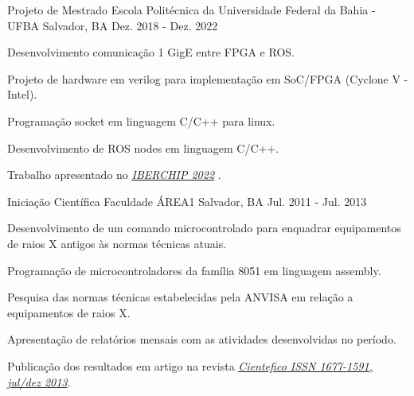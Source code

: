 \begin{cventries}
  \cventry
    {Projeto de Mestrado} %
    {Escola Politécnica da Universidade Federal da Bahia - UFBA} %
    {Salvador, BA} %
    {Dez. 2018 - Dez. 2022} %
    {
      \begin{cvitems} %
        \item {Desenvolvimento comunicação 1 GigE entre FPGA e ROS.}
        \item {Projeto de hardware em verilog para implementação em SoC/FPGA (Cyclone V - Intel).}
        \item {Programação socket em linguagem C/C++ para linux.}
        \item {Desenvolvimento de ROS nodes em linguagem C/C++.}
        \item {Trabalho apresentado no  \underline{\href{https://ieee-lascas.org/}{\emph{IBERCHIP 2022}}} .}
      \end{cvitems}
    }

  \cventry
    {Iniciação Científica} %
    {Faculdade ÁREA1} %
    {Salvador, BA} %
    {Jul. 2011 - Jul. 2013} %
    {
      \begin{cvitems} %
        \item {Desenvolvimento de um comando microcontrolado para enquadrar equipamentos de raios X antigos às normas técnicas atuais.}
        \item {Programação de microcontroladores da família 8051 em linguagem assembly.}
        \item {Pesquisa das normas técnicas estabelecidas pela ANVISA em relação a equipamentos de raios X.}
        \item {Apresentação de relatórios mensais com as atividades desenvolvidas no período.}
        \item {Publicação dos resultados em artigo na revista \underline{\href{https://cientefico.emnuvens.com.br/cientefico/article/view/58}{\emph{Cientefico ISSN 1677-1591, jul/dez 2013}}}.}
      \end{cvitems}
    }
    

\end{cventries}

